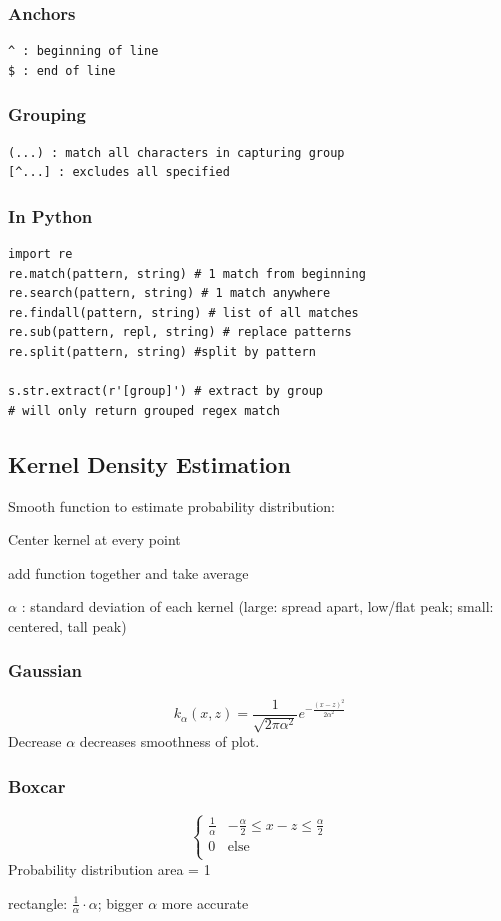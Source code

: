 \documentclass[8pt]{extarticle}
\begin{document}
\subsubsection*{Anchors}
\begin{verbatim}
^ : beginning of line
$ : end of line
\end{verbatim}

\subsubsection*{Grouping}
\begin{verbatim}
(...) : match all characters in capturing group
[^...] : excludes all specified
\end{verbatim}

\subsubsection*{In Python}
\begin{verbatim}
import re
re.match(pattern, string) # 1 match from beginning
re.search(pattern, string) # 1 match anywhere
re.findall(pattern, string) # list of all matches
re.sub(pattern, repl, string) # replace patterns
re.split(pattern, string) #split by pattern

s.str.extract(r'[group]') # extract by group
# will only return grouped regex match
\end{verbatim}
\hline

\subsection*{Kernel Density Estimation}
Smooth function to estimate probability distribution:

Center kernel at every point\par
add function together and take average\par
$\alpha$ : standard deviation of each kernel (large: spread apart, low/flat peak; small: centered, tall peak)\par

\subsubsection*{Gaussian}
$$ k_\alpha(x, z)=\frac{1}{\sqrt{2\pi\alpha^2}}e^{-\frac{(x-z)^2}{2\alpha^2}} $$
Decrease $\alpha$ decreases smoothness of plot.
\subsubsection*{Boxcar}
$$   \left\{
\begin{array}{ll}
      \frac{1}{\alpha} & -\frac{\alpha}{2} \leq x-z \leq  \frac{\alpha}{2}\\
      0 & \text{else} \\
\end{array}
\right. $$
Probability distribution area = 1\par
rectangle: $ \frac{1}{\alpha} \cdot \alpha $; bigger $\alpha$ more accurate\\
\hline
\end{document}
